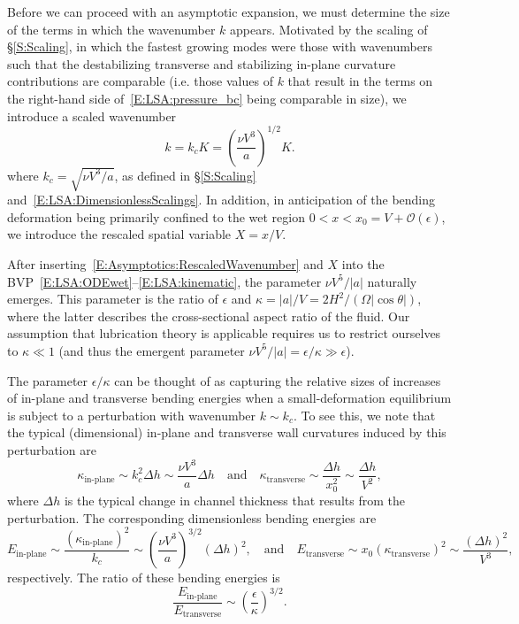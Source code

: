 \documentclass{jfm}
\begin{document}
Before we can proceed with an asymptotic expansion, we must determine the size of the terms in which the wavenumber $k$ appears. Motivated by the scaling of \S\ref{S:Scaling}, in which the fastest growing modes were those with wavenumbers such that the destabilizing transverse and stabilizing in-plane curvature contributions are comparable (i.e. those values of $k$ that result in the terms on the right-hand side of~\eqref{E:LSA:pressure_bc} being comparable in size), we introduce a scaled wavenumber
\begin{equation}\label{E:Asymptotics:RescaledWavenumber}
k = k_c K = \left(\frac{\nu V^3}{a}\right)^{1/2} K.
\end{equation}
where $k_c = \sqrt{\nu V^3 /a}$, as defined in \S\ref{S:Scaling} and~\eqref{E:LSA:DimensionlessScalings}. In addition, in anticipation of the bending deformation being primarily confined to the wet region $0 < x < x_0 = V + \mathcal{O}(\epsilon)$, we introduce the rescaled spatial variable $X = x/V$. 

After inserting~\eqref{E:Asymptotics:RescaledWavenumber} and $X$ into the BVP~\eqref{E:LSA:ODEwet}--\eqref{E:LSA:kinematic}, the parameter $\nu V^5/|a|$ naturally emerges. This parameter is the ratio of $\epsilon$ and $\kappa =|a|/V = 2H^2/ (\Omega |\cos \theta| )$, where the latter describes the cross-sectional aspect ratio of the fluid. Our assumption that lubrication theory is applicable requires us to restrict ourselves to $\kappa \ll 1$ (and thus the emergent parameter $ \nu V^5/|a| = \epsilon / \kappa \gg \epsilon$). 

The parameter $\epsilon/\kappa$ can be thought of as capturing the relative sizes of increases of in-plane and transverse bending energies when a small-deformation equilibrium is subject to a perturbation with wavenumber $k \sim k_c$.  To see this, we note that the typical (dimensional) in-plane and transverse wall curvatures induced by this perturbation are
\begin{equation}
\kappa_{\text{in-plane}} \sim k_c^2 \Delta h \sim \frac{\nu V^3}{a} \Delta h \quad \text{and}\quad \kappa_{\text{transverse}} \sim \frac{\Delta h}{x_0^2} \sim  \frac{\Delta h}{V^2},
\end{equation}
where $\Delta h$ is the typical change in channel thickness that results from the perturbation. The corresponding dimensionless bending energies are
\begin{equation}
E_{\text{in-plane}} \sim \frac{\left(\kappa_{\text{in-plane}}\right)^2}{k_c} \sim \left( \frac{\nu V^3}{a}\right)^{3/2}(\Delta h)^2,  \quad \text{and}\quad
E_{\text{transverse}} \sim x_0 \left(\kappa_{\text{transverse}}\right)^2 \sim \frac{(\Delta h)^2}{V^3},
\end{equation}
respectively. The ratio of these bending energies is 
\begin{equation}
\frac{E_{\text{in-plane}}}{ E_{\text{transverse}}}
\sim \left(\frac{\epsilon}{\kappa}\right)^{3/2}.
\end{equation}
\end{document}
